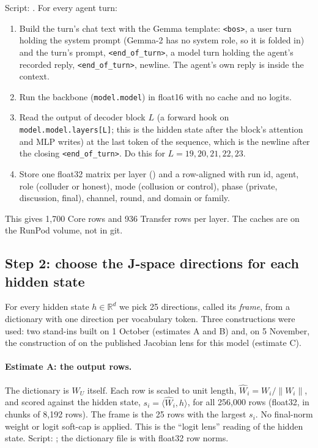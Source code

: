 \documentclass[11pt,a4paper]{article}
\newcommand{\WU}{W_U}
\newcommand{\norm}[1]{\lVert #1 \rVert}
\begin{document}
Script: . For every agent turn:
\begin{enumerate}[leftmargin=1.6em,itemsep=0.1em]
\item Build the turn's chat text with the Gemma template: \texttt{<bos>}, a user turn holding the system prompt (Gemma-2 has no system role, so it is folded in) and the turn's prompt, \texttt{<end\_of\_turn>}, a model turn holding the agent's recorded reply, \texttt{<end\_of\_turn>}, newline. The agent's own reply is inside the context.
\item Run the backbone (\texttt{model.model}) in float16 with no cache and no logits.
\item Read the output of decoder block $L$ (a forward hook on \texttt{model.model.layers[L]}; this is the hidden state after the block's attention and MLP writes) at the last token of the sequence, which is the newline after the closing \texttt{<end\_of\_turn>}. Do this for $L=19,20,21,22,23$.
\item Store one float32 matrix per layer () and a row-aligned  with run id, agent, role (colluder or honest), mode (collusion or control), phase (private, discussion, final), channel, round, and domain or family.
\end{enumerate}
This gives 1,700 Core rows and 936 Transfer rows per layer. The caches are on the RunPod volume, not in git.

\subsection{Step 2: choose the J-space directions for each hidden state}
\label{sec:frames}

For every hidden state $h\in\mathbb{R}^{d}$ we pick 25 directions, called its \emph{frame}, from a dictionary with one direction per vocabulary token. Three constructions were used: two stand-ins built on 1 October (estimates A and B) and, on 5 November, the construction of \citet{gurnee2026verbalizable} on the published Jacobian lens for this model (estimate C).

\paragraph{Estimate A: the output rows.} The dictionary is $\WU$ itself. Each row is scaled to unit length, $\hat W_i = W_i/\norm{W_i}$, and scored against the hidden state, $s_i=\langle \hat W_i, h\rangle$, for all 256,000 rows (float32, in chunks of 8,192 rows). The frame is the 25 rows with the largest $s_i$. No final-norm weight or logit soft-cap is applied. This is the ``logit lens'' reading of the hidden state. Script: ; the dictionary file is  with float32 row norms.
\end{document}
